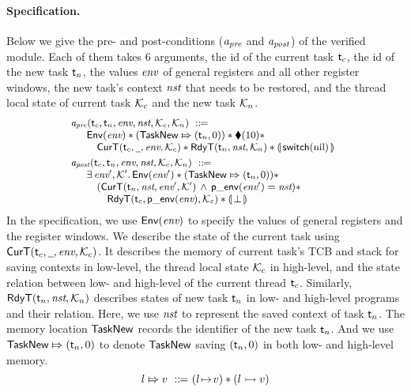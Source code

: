 \paragraph{\textbf{Specification.}}
Below we give the pre- and post-conditions
($\textit{a}_\textit{pre}$ and $\textit{a}_\textit{post}$) of the verified module.
Each of them takes 6 arguments, 
the id of the current task $\textsf{t}_c$, the id of the new 
task $\textsf{t}_n$, the values $\textit{env}$ of general registers and all
other register windows, the new task's context $\textit{nst}$
that needs to be restored, and the thread local state 
of current task $\mathcal{K}_c$ and the new task 
$\mathcal{K}_n$.  
\[
    \small
    \begin{array}{l}
        \textit{a}_\textit{pre}(\textsf{t}_c, \textsf{t}_n, \textit{env}, \textit{nst}, \mathcal{K}_c, \mathcal{K}_n)
        \ ::\!\!{=} \\
        \quad
        \begin{array}{l}
            \mathsf{Env}({\textit{env}}) *
            ({\mathsf{TaskNew}}\Mapsto{(\textsf{t}_n, 0)}) * 
            \blacklozenge({10}) * \\
            \quad
            \textsf{CurT}({\textsf{t}_c}, {\underline{\ \,}}, {\textit{env}}, {\mathcal{K}_c}) * 
            \textsf{RdyT}({\textsf{t}_n}, {\textit{nst}}, {\mathcal{K}_n}) * 
            \llparenthesis {\, \mathsf{switch}(\text{nil}) \,} \rrparenthesis
        \end{array}
        \\
        \\[-8pt]
        \textit{a}_\textit{post}(\textsf{t}_c, \textsf{t}_n, \textit{env}, \textit{nst}, \mathcal{K}_c, \mathcal{K}_n)
        \ ::\!\!{=} \\ 
        \quad
        \begin{array}{l}
            \exists \, \textit{env}', \mathcal{K}'. \, \mathsf{Env}({\textit{env}'}) 
            * ({\mathsf{TaskNew}}\Mapsto{(\textsf{t}_n, 0)}) 
            * \
            \\
            \quad
            (\textsf{CurT}({\textsf{t}_n}, {\textit{nst}}, {\textit{env}'}, {\mathcal{K}'})
            \,\land\,\mathsf{p\_env}({\textit{env}'}) = \textit{nst}) * 
            \\
            \qquad
            \textsf{RdyT}({\textsf{t}_c}, {\mathsf{p\_env}({\textit{env}})}, {\mathcal{K}_c}) * 
            \llparenthesis {\, \perp\,} \rrparenthesis
        \end{array}
    \end{array}
\]
In the specification,
we use $\mathsf{Env}({\textit{env}})$ to specify the values of
general registers and the register windows.
We describe the state
of the current task 
using $\textsf{CurT}({\textsf{t}_c}, {\underline{\ \,}}, {\textit{env}}, {\mathcal{K}_c})$. 
It describes the memory of current task's TCB 
and stack for saving contexts in low-level, 
the thread local state $\mathcal{K}_c$ in high-level, 
and the state relation between low- 
and high-level of the current thread $\textsf{t}_c$.  
Similarly, $\textsf{RdyT}({\textsf{t}_n}, {\textit{nst}}, {\mathcal{K}_n})$  
describes states of new task $\textsf{t}_n$ in low- and high-level 
programs and their relation. 
Here, we use $\textit{nst}$ to represent the saved context 
of task $\textsf{t}_n$. The memory location 
$\mathsf{TaskNew}$ records the identifier of the new task $\textsf{t}_n$.  
And we use ${\mathsf{TaskNew}}\Mapsto{(\textsf{t}_n, 0)}$ to denote 
$\mathsf{TaskNew}$ saving $(\textsf{t}_n, 0)$ 
in both low- and high-level memory. 
\[
    \relmsto{\loc}{\val} \ \define \ 
    (\msto{\loc}{\val}) \sepstar (\hmsto{\loc}{\val})
\]

